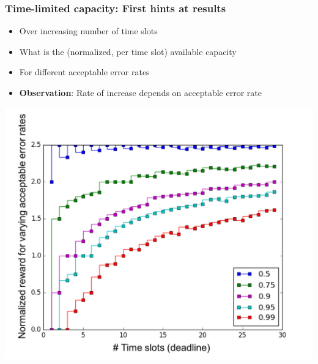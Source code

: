 \documentclass{beamer}
\begin{document}
\begin{frame}
  \frametitle{Time-limited capacity: First hints at results}
  \begin{itemize}
    
  \item Over increasing number of time slots 
  \item What is the (normalized, per time slot) available capacity
  \item For different acceptable error rates 
  \item \textbf{Observation}: Rate of increase depends on acceptable error rate 
  \end{itemize}
  
  \begin{center}
    \includegraphics[width=0.6\columnwidth]{rewards-correlated}
  \end{center}
\end{frame}
\end{document}
